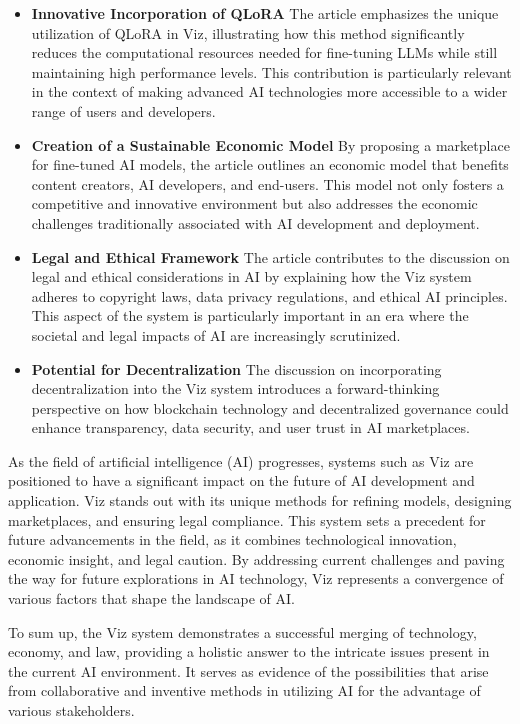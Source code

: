 \documentclass{article}
\begin{document}
\begin{itemize} 
\item \textbf{Innovative Incorporation of QLoRA} The article emphasizes the unique utilization of QLoRA in Viz, illustrating how this method significantly reduces the computational resources needed for fine-tuning LLMs while still maintaining high performance levels. This contribution is particularly relevant in the context of making advanced AI technologies more accessible to a wider range of users and developers. 
\item \textbf{Creation of a Sustainable Economic Model} By proposing a marketplace for fine-tuned AI models, the article outlines an economic model that benefits content creators, AI developers, and end-users. This model not only fosters a competitive and innovative environment but also addresses the economic challenges traditionally associated with AI development and deployment.
\item \textbf{Legal and Ethical Framework} The article contributes to the discussion on legal and ethical considerations in AI by explaining how the Viz system adheres to copyright laws, data privacy regulations, and ethical AI principles. This aspect of the system is particularly important in an era where the societal and legal impacts of AI are increasingly scrutinized.
\item \textbf{Potential for Decentralization} The discussion on incorporating decentralization into the Viz system introduces a forward-thinking perspective on how blockchain technology and decentralized governance could enhance transparency, data security, and user trust in AI marketplaces.  
\end{itemize}

As the field of artificial intelligence (AI) progresses, systems such as Viz are positioned to have a significant impact on the future of AI development and application. Viz stands out with its unique methods for refining models, designing marketplaces, and ensuring legal compliance. This system sets a precedent for future advancements in the field, as it combines technological innovation, economic insight, and legal caution. By addressing current challenges and paving the way for future explorations in AI technology, Viz represents a convergence of various factors that shape the landscape of AI.

To sum up, the Viz system demonstrates a successful merging of technology, economy, and law, providing a holistic answer to the intricate issues present in the current AI environment. It serves as evidence of the possibilities that arise from collaborative and inventive methods in utilizing AI for the advantage of various stakeholders.



\end{document}
